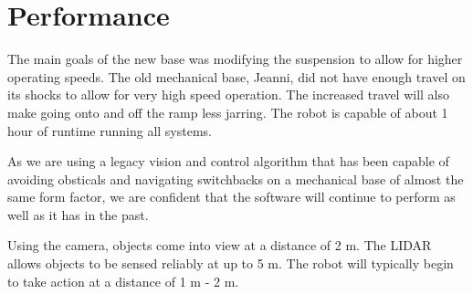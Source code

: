\section{Performance}

The main goals of the new base was modifying the suspension to allow for higher operating speeds. The old mechanical base, Jeanni, did not have enough travel on its shocks to allow for very high speed operation. The increased travel will also make going onto and off the ramp less jarring. The robot is capable of about 1 hour of runtime running all systems.

As we are using a legacy vision and control algorithm that has been capable of avoiding obsticals and navigating switchbacks on a mechanical base of almost the same form factor, we are confident that the software will continue to perform as well as it has in the past.

Using the camera, objects come into view at a distance of 2 m. The LIDAR allows objects to be sensed reliably at up to 5 m. The robot will typically begin to take action at a distance of 1 m - 2 m.